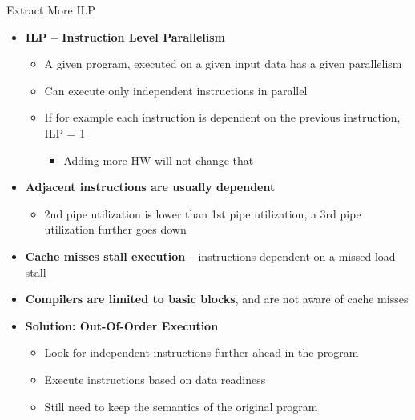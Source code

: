 \documentclass[aspectratio=169,12pt]{beamer}
\begin{document}
\begin{frame}{Extract More ILP}
  \begin{itemize}
    \item \textbf{ILP -- Instruction Level Parallelism}
    \begin{itemize}
      \item A given program, executed on a given input data has a given parallelism
      \item Can execute only independent instructions in parallel
      \item If for example each instruction is dependent on the previous instruction, ILP = 1
      \begin{itemize}
        \item Adding more HW will not change that
      \end{itemize}
    \end{itemize}
    
    \item \textbf{Adjacent instructions are usually dependent}
    \begin{itemize}
      \item 2nd pipe utilization is lower than 1st pipe utilization, a 3rd pipe utilization further goes down
    \end{itemize}
    
    \item \textbf{Cache misses stall execution} -- instructions dependent on a missed load stall
    
    \item \textbf{Compilers are limited to basic blocks}, and are not aware of cache misses
    
    \item \textbf{Solution: Out-Of-Order Execution}
    \begin{itemize}
      \item Look for independent instructions further ahead in the program
      \item Execute instructions based on data readiness
      \item Still need to keep the semantics of the original program
    \end{itemize}
  \end{itemize}
\end{frame}
\end{document}
